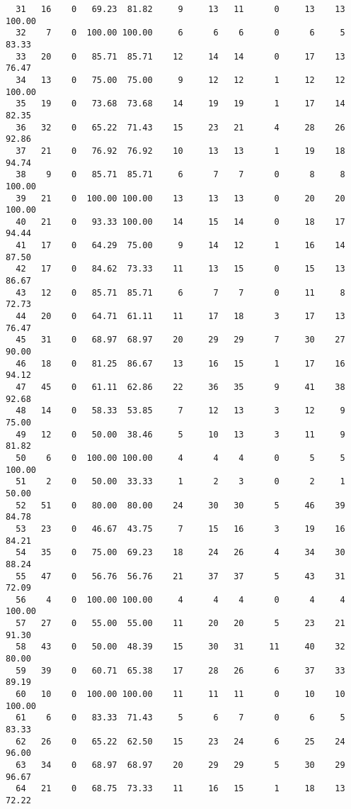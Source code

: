 \begin{verbatim}
  31   16    0   69.23  81.82     9     13   11      0     13    13   100.00
  32    7    0  100.00 100.00     6      6    6      0      6     5    83.33
  33   20    0   85.71  85.71    12     14   14      0     17    13    76.47
  34   13    0   75.00  75.00     9     12   12      1     12    12   100.00
  35   19    0   73.68  73.68    14     19   19      1     17    14    82.35
  36   32    0   65.22  71.43    15     23   21      4     28    26    92.86
  37   21    0   76.92  76.92    10     13   13      1     19    18    94.74
  38    9    0   85.71  85.71     6      7    7      0      8     8   100.00
  39   21    0  100.00 100.00    13     13   13      0     20    20   100.00
  40   21    0   93.33 100.00    14     15   14      0     18    17    94.44
  41   17    0   64.29  75.00     9     14   12      1     16    14    87.50
  42   17    0   84.62  73.33    11     13   15      0     15    13    86.67
  43   12    0   85.71  85.71     6      7    7      0     11     8    72.73
  44   20    0   64.71  61.11    11     17   18      3     17    13    76.47
  45   31    0   68.97  68.97    20     29   29      7     30    27    90.00
  46   18    0   81.25  86.67    13     16   15      1     17    16    94.12
  47   45    0   61.11  62.86    22     36   35      9     41    38    92.68
  48   14    0   58.33  53.85     7     12   13      3     12     9    75.00
  49   12    0   50.00  38.46     5     10   13      3     11     9    81.82
  50    6    0  100.00 100.00     4      4    4      0      5     5   100.00
  51    2    0   50.00  33.33     1      2    3      0      2     1    50.00
  52   51    0   80.00  80.00    24     30   30      5     46    39    84.78
  53   23    0   46.67  43.75     7     15   16      3     19    16    84.21
  54   35    0   75.00  69.23    18     24   26      4     34    30    88.24
  55   47    0   56.76  56.76    21     37   37      5     43    31    72.09
  56    4    0  100.00 100.00     4      4    4      0      4     4   100.00
  57   27    0   55.00  55.00    11     20   20      5     23    21    91.30
  58   43    0   50.00  48.39    15     30   31     11     40    32    80.00
  59   39    0   60.71  65.38    17     28   26      6     37    33    89.19
  60   10    0  100.00 100.00    11     11   11      0     10    10   100.00
  61    6    0   83.33  71.43     5      6    7      0      6     5    83.33
  62   26    0   65.22  62.50    15     23   24      6     25    24    96.00
  63   34    0   68.97  68.97    20     29   29      5     30    29    96.67
  64   21    0   68.75  73.33    11     16   15      1     18    13    72.22

\end{verbatim}
